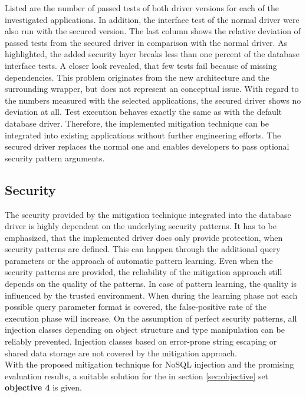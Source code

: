 Listed are the number of passed tests of both driver versions for each of the investigated applications. In addition, the interface test of the normal driver were also run with the secured version. The last column shows the relative deviation of passed tests from the secured driver in comparison with the normal driver. As highlighted, the added security layer breaks less than one percent of the database interface tests. A closer look revealed, that few tests fail because of missing dependencies. This problem originates from the new architecture and the surrounding wrapper, but does not represent an conceptual issue. With regard to the numbers measured with the selected applications, the secured driver shows no deviation at all. Test execution behaves exactly the same as with the default database driver. Therefore, the implemented mitigation technique can be integrated into existing applications without further engineering efforts. The secured driver replaces the normal one and enables developers to pass optional security pattern arguments. 

\subsection{Security}
The security provided by the mitigation technique integrated into the database driver is highly dependent on the underlying security patterns. It has to be emphasized, that the implemented driver does only provide protection, when security patterns are defined. This can happen through the additional query parameters or the approach of automatic pattern learning. Even when the security patterns are provided, the reliability of the mitigation approach still depends on the quality of the patterns. In case of pattern learning, the quality is influenced by the trusted environment. When during the learning phase not each possible query parameter format is covered, the false-positive rate of the execution phase will increase. On the assumption of perfect security patterns, all injection classes depending on object structure and type manipulation can be reliably prevented. Injection classes based on error-prone string escaping or shared data storage are not covered by the mitigation approach. \\

With the proposed mitigation technique for NoSQL injection and the promising evaluation results, a suitable solution for the in section \ref{sec:objective} set \textbf{objective 4} is given.